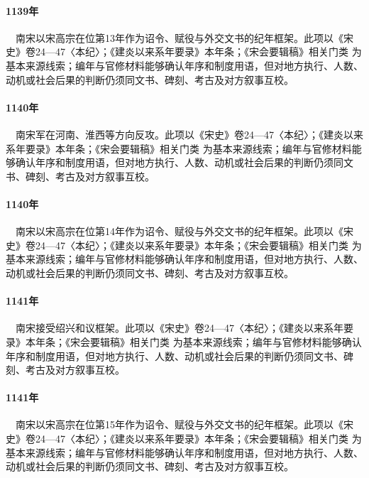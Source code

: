 \paragraph{1139年}　南宋以宋高宗在位第13年作为诏令、赋役与外交文书的纪年框架。此项以《宋史》卷24—47〈本纪〉；《建炎以来系年要录》本年条；《宋会要辑稿》相关门类 为基本来源线索；编年与官修材料能够确认年序和制度用语，但对地方执行、人数、动机或社会后果的判断仍须同文书、碑刻、考古及对方叙事互校。

\paragraph{1140年}　南宋军在河南、淮西等方向反攻。此项以《宋史》卷24—47〈本纪〉；《建炎以来系年要录》本年条；《宋会要辑稿》相关门类 为基本来源线索；编年与官修材料能够确认年序和制度用语，但对地方执行、人数、动机或社会后果的判断仍须同文书、碑刻、考古及对方叙事互校。

\paragraph{1140年}　南宋以宋高宗在位第14年作为诏令、赋役与外交文书的纪年框架。此项以《宋史》卷24—47〈本纪〉；《建炎以来系年要录》本年条；《宋会要辑稿》相关门类 为基本来源线索；编年与官修材料能够确认年序和制度用语，但对地方执行、人数、动机或社会后果的判断仍须同文书、碑刻、考古及对方叙事互校。

\paragraph{1141年}　南宋接受绍兴和议框架。此项以《宋史》卷24—47〈本纪〉；《建炎以来系年要录》本年条；《宋会要辑稿》相关门类 为基本来源线索；编年与官修材料能够确认年序和制度用语，但对地方执行、人数、动机或社会后果的判断仍须同文书、碑刻、考古及对方叙事互校。

\paragraph{1141年}　南宋以宋高宗在位第15年作为诏令、赋役与外交文书的纪年框架。此项以《宋史》卷24—47〈本纪〉；《建炎以来系年要录》本年条；《宋会要辑稿》相关门类 为基本来源线索；编年与官修材料能够确认年序和制度用语，但对地方执行、人数、动机或社会后果的判断仍须同文书、碑刻、考古及对方叙事互校。

